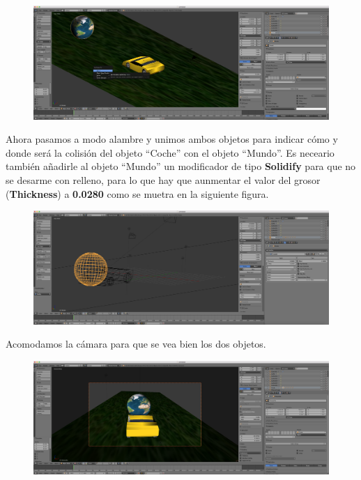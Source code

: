 \documentclass[10pt]{article}
\begin{document}
\begin{figure}[H]
	\begin{center}
	 		\includegraphics[width = 1.00\textwidth]{Imagenes/p5-img4}
	\end{center} 
\end{figure}

Ahora pasamos a modo alambre y unimos ambos objetos para indicar cómo y donde será la colisión del objeto ``Coche'' con el objeto ``Mundo''. Es neceario también añadirle al objeto ``Mundo'' un modificador de tipo \textbf{Solidify} para que no se desarme con relleno, para lo que hay que aunmentar el valor del grosor (\textbf{Thickness}) a \textbf{0.0280} como se muetra en la siguiente figura.\\

\begin{figure}[H]
	\begin{center}
	 		\includegraphics[width = 1.00\textwidth]{Imagenes/p5-img5}
	\end{center} 
\end{figure}

Acomodamos la cámara para que se vea bien los dos objetos. \\

\begin{figure}[H]
	\begin{center}
	 		\includegraphics[width = 1.00\textwidth]{Imagenes/p5-img6}
	\end{center} 
\end{figure}
\end{document}
